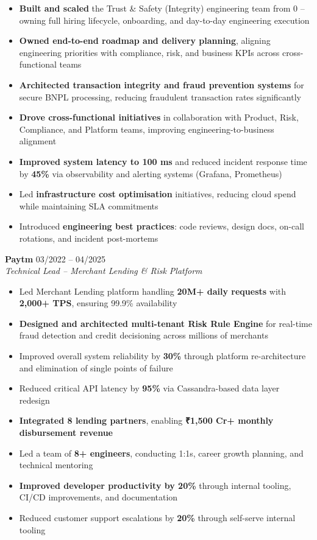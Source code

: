 \documentclass[a4paper,11pt]{article}
\begin{document}
\begin{itemize}
\item \textbf{Built and scaled} the Trust \& Safety (Integrity) engineering team from 0 -- owning full hiring lifecycle, onboarding, and day-to-day engineering execution
\item \textbf{Owned end-to-end roadmap and delivery planning}, aligning engineering priorities with compliance, risk, and business KPIs across cross-functional teams
\item \textbf{Architected transaction integrity and fraud prevention systems} for secure BNPL processing, reducing fraudulent transaction rates significantly
\item \textbf{Drove cross-functional initiatives} in collaboration with Product, Risk, Compliance, and Platform teams, improving engineering-to-business alignment
\item \textbf{Improved system latency to 100 ms} and reduced incident response time by \textbf{45\%} via observability and alerting systems (Grafana, Prometheus)
\item Led \textbf{infrastructure cost optimisation} initiatives, reducing cloud spend while maintaining SLA commitments
\item Introduced \textbf{engineering best practices}: code reviews, design docs, on-call rotations, and incident post-mortems
\end{itemize}

\vspace{10pt}

\noindent
\textbf{Paytm} \hfill 03/2022 -- 04/2025 \\
\textit{Technical Lead -- Merchant Lending \& Risk Platform}

\begin{itemize}
\item Led Merchant Lending platform handling \textbf{20M+ daily requests} with \textbf{2,000+ TPS}, ensuring 99.9\% availability
\item \textbf{Designed and architected multi-tenant Risk Rule Engine} for real-time fraud detection and credit decisioning across millions of merchants
\item Improved overall system reliability by \textbf{30\%} through platform re-architecture and elimination of single points of failure
\item Reduced critical API latency by \textbf{95\%} via Cassandra-based data layer redesign
\item \textbf{Integrated 8 lending partners}, enabling \textbf{₹1,500 Cr+ monthly disbursement revenue}
\item Led a team of \textbf{8+ engineers}, conducting 1:1s, career growth planning, and technical mentoring
\item \textbf{Improved developer productivity by 20\%} through internal tooling, CI/CD improvements, and documentation
\item Reduced customer support escalations by \textbf{20\%} through self-serve internal tooling
\end{itemize}
\end{document}
